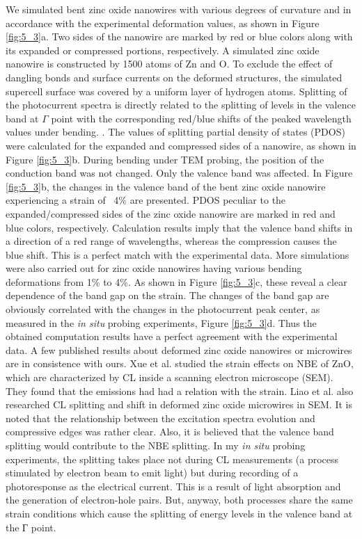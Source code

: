 We simulated bent zinc oxide nanowires with various degrees of curvature and in accordance with the experimental deformation values, as shown in Figure \ref{fig:5_3}a.
Two sides of the nanowire are marked by red or blue colors along with its expanded or compressed portions, respectively. 
A simulated zinc oxide nanowire is constructed by 1500 atoms of Zn and O. 
To exclude the effect of dangling bonds and surface currents on the deformed structures, the simulated supercell surface was covered by a uniform layer of hydrogen atoms. 
Splitting of the photocurrent spectra is directly related to the splitting of levels in the valence band at $\Gamma$ point with the corresponding red/blue shifts of the peaked wavelength values under bending. .\cite{D.-P.2012} 
The values of splitting partial density of states (PDOS) were calculated for the expanded and compressed sides of a nanowire, as shown in Figure \ref{fig:5_3}b. 
During bending under TEM probing, the position of the conduction band was not changed. 
Only the valence band was affected. 
In Figure \ref{fig:5_3}b, the changes in the valence band of the bent zinc oxide nanowire experiencing a strain of ~4\% are presented. 
PDOS peculiar to the expanded/compressed sides of the zinc oxide nanowire are marked in red and blue colors, respectively. 
Calculation results imply that the valence band shifts in a direction of a red range of wavelengths, whereas the compression causes the blue shift. 
This is a perfect match with the experimental data. 
More simulations were also carried out for zinc oxide nanowires having various bending deformations from 1\% to 4\%. 
As shown in Figure \ref{fig:5_3}c, these reveal a clear dependence of the band gap on the strain.  
The changes of the band gap are obviously correlated with the changes in the photocurrent peak center, as measured in the {\em in situ} probing experiments, Figure \ref{fig:5_3}d. 
Thus the obtained computation results have a perfect agreement with the experimental data. 
A few published results about deformed zinc oxide nanowires or microwires are in consistence with ours. 
Xue et al. studied the strain effects on NBE of ZnO, which are characterized by CL inside a scanning electron microscope (SEM). They found that the emissions had had a relation with the strain.\cite{G.2010}
Liao et al. also researched CL splitting and shift in deformed zinc oxide microwires in SEM. It is noted that the relationship between the excitation spectra evolution and compressive edges was rather clear. Also, it is believed that the valence band splitting would contribute to the NBE splitting.\cite{T.2009} 
In my {\em in situ} probing experiments, the splitting takes place not during CL measurements (a process stimulated by electron beam to emit light) but during recording of a photoresponse as the electrical current. 
This is a result of light absorption and the generation of electron-hole pairs.
But, anyway, both processes share the same strain conditions which cause the splitting of energy levels in the valence band at the Г point. 

